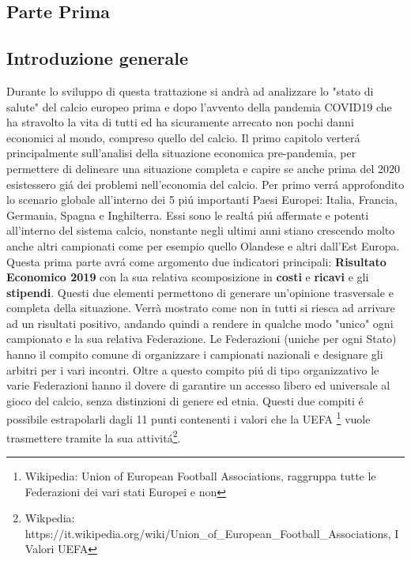 \documentclass[
    corpo=12pt,
    oneside,
    evenboxes,
    tipotesi=triennale,
    stile=classica,
    oldstyle,
    autoretitolo,
    greek,
]{toptesi}
\begin{document}
\mainmatter
\begin{interlinea}{1.5}

\part{Parte Prima}
\chapter{Introduzione generale}
Durante lo sviluppo di questa trattazione si andrà ad analizzare lo "stato di salute" del calcio europeo prima e dopo 
l'avvento della pandemia COVID19 che ha stravolto la vita di tutti ed ha sicuramente arrecato non pochi danni 
economici al mondo, compreso quello del calcio.\newline
Il primo capitolo verter\'a principalmente sull'analisi della situazione economica pre-pandemia, per permettere di delineare una situazione
completa e capire se anche prima del 2020 esistessero gi\'a dei problemi nell'economia del calcio. Per primo verr\'a approfondito lo scenario
globale all'interno dei 5 pi\'u importanti Paesi Europei: Italia, Francia, Germania, Spagna e Inghilterra. Essi sono le realt\'a pi\'u 
affermate e potenti all'interno del sistema calcio, nonstante negli ultimi anni stiano crescendo molto anche altri campionati come per esempio
quello Olandese e altri dall'Est Europa. Questa prima parte avr\'a come argomento due indicatori principali: \textbf{Risultato Economico 2019} 
con la sua relativa scomposizione in \textbf{costi} e \textbf{ricavi} e gli \textbf{stipendi}. Questi due elementi
permettono di generare un'opinione trasversale e completa della situazione. Verrà mostrato come non in tutti 
si riesca ad arrivare ad un risultati positivo, andando quindi a rendere in qualche modo 
"unico" ogni campionato e la sua relativa Federazione. Le Federazioni (uniche per ogni Stato) hanno il compito
comune di organizzare i campionati nazionali e designare gli arbitri per i vari incontri. Oltre a questo compito pi\'u di tipo
organizzativo le varie Federazioni hanno il dovere di garantire un accesso libero ed universale al gioco del calcio, senza distinzioni
di genere ed etnia. Questi due compiti \'e possibile estrapolarli dagli 11 punti contenenti i valori che la UEFA
\footnote{Wikipedia: Union of European Football Associations, raggruppa tutte le Federazioni dei vari stati Europei e non} vuole
trasmettere tramite la sua attivit\'a\footnote{Wikpedia: https://it.wikipedia.org/wiki/Union\_of\_European\_Football\_Associations, I Valori UEFA}.\newline

\end{interlinea}
\end{document}
